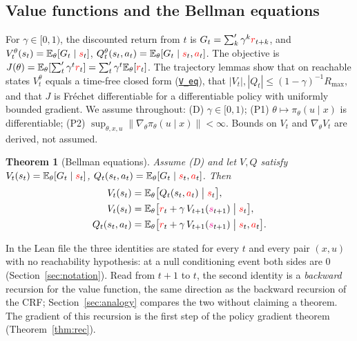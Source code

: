 \documentclass[11pt,a4paper]{article}
\newcommand{\lmod}[2]{\href{http://www.lemma.cn/lean/?module=#2}{\nolinkurl{#1}}}
\newtheorem{theorem}{Theorem}[section]
\newcommand{\E}{\mathbb{E}}
\newcommand{\rv}[1]{{\color{red}#1}}       %
\newcommand{\ra}[1]{{\color{magenta}#1}}   %
\newcommand{\sv}{\rv{s}}
\newcommand{\av}{\rv{a}}
\newcommand{\rw}{\rv{r}}
\newcommand{\grad}{\nabla_{\theta}}
\newcommand{\tsum}{\textstyle\sum'}
\begin{document}
\subsection{Value functions and the Bellman equations}
\label{sec:bellmaneq}
For $\gamma\in[0,1)$, the discounted return from $t$ is $G_t=\tsum_k\gamma^k\rw_{t+k}$, and
$V_t^\theta(s_t)=\E_\theta[G_t\mid\sv_t]$, $Q_t^\theta(s_t,a_t)=\E_\theta[G_t\mid\sv_t,\av_t]$.
The objective is $J(\theta)=\E_\theta[\tsum_t\gamma^t\rw_t]=\tsum_t\gamma^t\E_\theta[\rw_t]$.
The trajectory lemmas show that on reachable states $V_t^\theta$ equals a time-free closed form (\lmod{V_eq}{Random.V.eq.TSum_MulPowWRc.of.Ne0Real_Preimage.In_Ico}), that $|V_t|,|Q_t|\le(1-\gamma)^{-1}R_{\max}$, and that $J$ is Fr\'echet differentiable for a differentiable policy with uniformly bounded gradient.
We assume throughout:
(D) $\gamma\in[0,1)$; (P1) $\theta\mapsto\pi_\theta(u\mid x)$ is differentiable; (P2) $\sup_{\theta,x,u}\|\grad\pi_\theta(u\mid x)\|<\infty$.
Bounds on $V_t$ and $\grad V_t$ are derived, not assumed.

\begin{theorem}[Bellman equations]
\label{thm:bellman}
Assume (D) and let $V,Q$ satisfy $V_t(s_t)=\E_\theta[G_t\mid\sv_t]$, $Q_t(s_t,a_t)=\E_\theta[G_t\mid\sv_t,\av_t]$.
Then
\begin{align*}
V_t(s_t)&=\E_\theta\bigl[Q_t(s_t,\av_t)\bigm|\sv_t\bigr],\\
V_t(s_t)&=\E_\theta\bigl[\rw_t+\gamma\,V_{t+1}(\ra{s}_{t+1})\bigm|\sv_t\bigr],\\
Q_t(s_t,a_t)&=\E_\theta\bigl[\rw_t+\gamma\,V_{t+1}(\ra{s}_{t+1})\bigm|\sv_t,\av_t\bigr].
\end{align*}
\end{theorem}
In the Lean file the three identities are stated for every $t$ and every pair $(x,u)$ with no reachability hypothesis: at a null conditioning event both sides are $0$ (Section~\ref{sec:notation}).
Read from $t+1$ to $t$, the second identity is a \emph{backward} recursion for the value function, the same direction as the backward recursion of the CRF; Section~\ref{sec:analogy} compares the two without claiming a theorem.
The gradient of this recursion is the first step of the policy gradient theorem (Theorem~\ref{thm:rec}).
\end{document}

